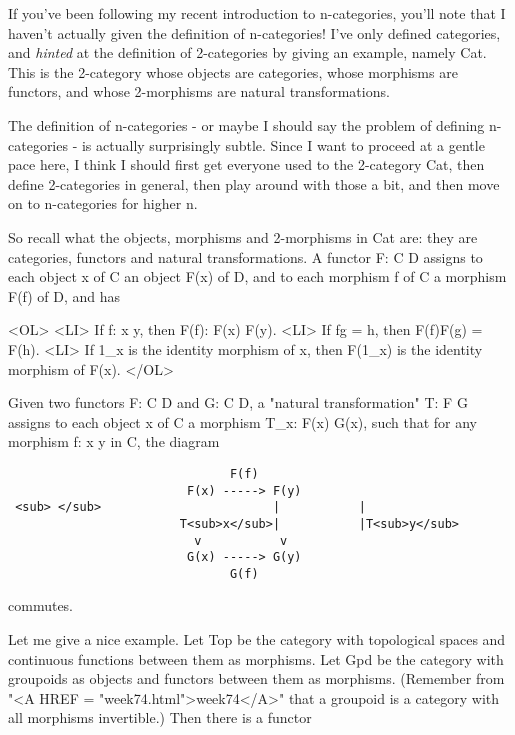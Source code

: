 


If you've been following my recent introduction to n-categories, you'll
note that I haven't actually given the definition of n-categories!  I've
only defined categories, and \emph{hinted} at the definition of 2-categories
by giving an example, namely Cat.  This is the 2-category whose objects
are categories, whose morphisms are functors, and whose 2-morphisms are
natural transformations.

The definition of n-categories - or maybe I should say the problem of
defining n-categories - is actually surprisingly subtle.  Since I want
to proceed at a gentle pace here, I think I should first get everyone
used to the 2-category Cat, then define 2-categories in general, then
play around with those a bit, and then move on to n-categories for
higher n.  

So recall what the objects, morphisms and 2-morphisms in Cat are: they
are categories, functors and natural transformations.  A functor F: C \to 
D assigns to each object x of C an object F(x) of D, and to each morphism
f of C a morphism F(f) of D, and has 

<OL>
<LI>
If f: x \to  y, then F(f): F(x) \to  F(y).
<LI>
If fg = h, then F(f)F(g) = F(h). 
<LI>
If 1_{x} is the identity morphism of x, then F(1_{x}) 
is the identity  morphism of F(x). 
</OL>

Given two functors F: C \to  D and G: C \to  D, a "natural
transformation" T: F \to  G assigns to each object x of C a
morphism T_{x}: F(x) \to  G(x), such that for any morphism f: x
\to  y in C, the diagram

\begin{verbatim}
                               F(f)
                         F(x) -----> F(y)
 <sub> </sub>                        |           |
                        T<sub>x</sub>|           |T<sub>y</sub>
                          v           v
                         G(x) -----> G(y)
                               G(f)

\end{verbatim}
    
commutes.  

Let me give a nice example.  Let Top be the category with topological
spaces and continuous functions between them as morphisms.  Let Gpd be
the category with groupoids as objects and functors between them as
morphisms.  (Remember from "<A HREF = "week74.html">week74</A>" that a groupoid is a category with
all morphisms invertible.)  Then there is a functor

